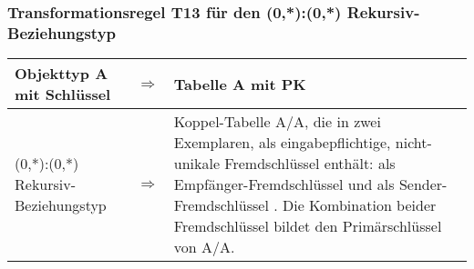         \subsubsection{Transformationsregel T13 für den (0,*):(0,*) Rekursiv-Beziehungstyp}
          \begin{supertabular}[h]{|l|l|p{7.5cm}|}
            \footnotesize Objekttyp A mit Schlüssel  & $\Rightarrow $ & \footnotesize Tabelle A mit PK \\
            \hline
            \footnotesize (0,*):(0,*) Rekursiv-Beziehungstyp & $\Rightarrow $ & \footnotesize Koppel-Tabelle A/A, die  in zwei Exemplaren, als eingabepflichtige, nicht-unikale Fremdschlüssel enthält: als Empfänger-Fremdschlüssel  und als Sender-Fremdschlüssel . Die Kombination beider Fremdschlüssel bildet den Primärschlüssel von A/A.\\
          \end{supertabular}



